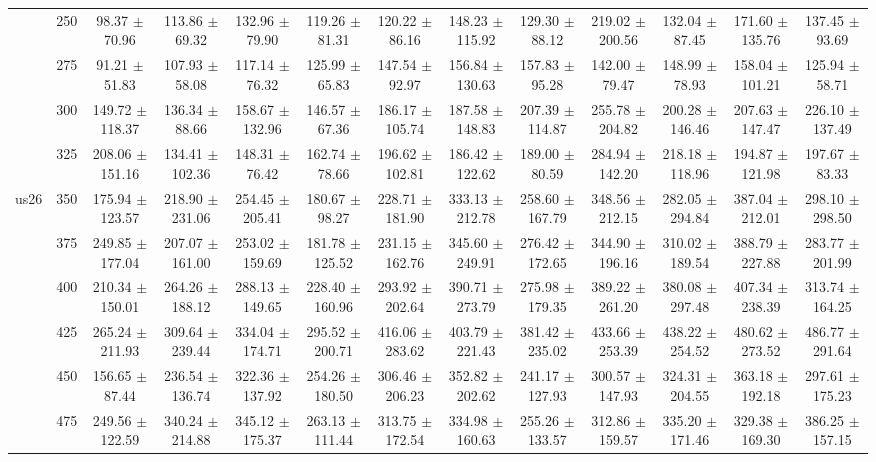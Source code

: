 \begin{table}[h]
{\begin{tabular}{
        ccccccccccccc}
 & 250& 98.37 $\pm$ 70.96& 113.86 $\pm$ 69.32& 132.96 $\pm$ 79.90& 119.26 $\pm$ 81.31& 120.22 $\pm$ 86.16& 148.23 $\pm$ 115.92& 129.30 $\pm$ 88.12& 219.02 $\pm$ 200.56& 132.04 $\pm$ 87.45& 171.60 $\pm$ 135.76& 137.45 $\pm$ 93.69 \\ 
 & 275& 91.21 $\pm$ 51.83& 107.93 $\pm$ 58.08& 117.14 $\pm$ 76.32& 125.99 $\pm$ 65.83& 147.54 $\pm$ 92.97& 156.84 $\pm$ 130.63& 157.83 $\pm$ 95.28& 142.00 $\pm$ 79.47& 148.99 $\pm$ 78.93& 158.04 $\pm$ 101.21& 125.94 $\pm$ 58.71 \\ 
 & 300& 149.72 $\pm$ 118.37& 136.34 $\pm$ 88.66& 158.67 $\pm$ 132.96& 146.57 $\pm$ 67.36& 186.17 $\pm$ 105.74& 187.58 $\pm$ 148.83& 207.39 $\pm$ 114.87& 255.78 $\pm$ 204.82& 200.28 $\pm$ 146.46& 207.63 $\pm$ 147.47& 226.10 $\pm$ 137.49 \\ 
 & 325& 208.06 $\pm$ 151.16& 134.41 $\pm$ 102.36& 148.31 $\pm$ 76.42& 162.74 $\pm$ 78.66& 196.62 $\pm$ 102.81& 186.42 $\pm$ 122.62& 189.00 $\pm$ 80.59& 284.94 $\pm$ 142.20& 218.18 $\pm$ 118.96& 194.87 $\pm$ 121.98& 197.67 $\pm$ 83.33 \\ 
\multirow{4}{*}{us26}& 350& 175.94 $\pm$ 123.57& 218.90 $\pm$ 231.06& 254.45 $\pm$ 205.41& 180.67 $\pm$ 98.27& 228.71 $\pm$ 181.90& 333.13 $\pm$ 212.78& 258.60 $\pm$ 167.79& 348.56 $\pm$ 212.15& 282.05 $\pm$ 294.84& 387.04 $\pm$ 212.01& 298.10 $\pm$ 298.50 \\ 
 & 375& 249.85 $\pm$ 177.04& 207.07 $\pm$ 161.00& 253.02 $\pm$ 159.69& 181.78 $\pm$ 125.52& 231.15 $\pm$ 162.76& 345.60 $\pm$ 249.91& 276.42 $\pm$ 172.65& 344.90 $\pm$ 196.16& 310.02 $\pm$ 189.54& 388.79 $\pm$ 227.88& 283.77 $\pm$ 201.99 \\ 
 & 400& 210.34 $\pm$ 150.01& 264.26 $\pm$ 188.12& 288.13 $\pm$ 149.65& 228.40 $\pm$ 160.96& 293.92 $\pm$ 202.64& 390.71 $\pm$ 273.79& 275.98 $\pm$ 179.35& 389.22 $\pm$ 261.20& 380.08 $\pm$ 297.48& 407.34 $\pm$ 238.39& 313.74 $\pm$ 164.25 \\ 
 & 425& 265.24 $\pm$ 211.93& 309.64 $\pm$ 239.44& 334.04 $\pm$ 174.71& 295.52 $\pm$ 200.71& 416.06 $\pm$ 283.62& 403.79 $\pm$ 221.43& 381.42 $\pm$ 235.02& 433.66 $\pm$ 253.39& 438.22 $\pm$ 254.52& 480.62 $\pm$ 273.52& 486.77 $\pm$ 291.64 \\ 
 & 450& 156.65 $\pm$ 87.44& 236.54 $\pm$ 136.74& 322.36 $\pm$ 137.92& 254.26 $\pm$ 180.50& 306.46 $\pm$ 206.23& 352.82 $\pm$ 202.62& 241.17 $\pm$ 127.93& 300.57 $\pm$ 147.93& 324.31 $\pm$ 204.55& 363.18 $\pm$ 192.18& 297.61 $\pm$ 175.23 \\ 
 & 475& 249.56 $\pm$ 122.59& 340.24 $\pm$ 214.88& 345.12 $\pm$ 175.37& 263.13 $\pm$ 111.44& 313.75 $\pm$ 172.54& 334.98 $\pm$ 160.63& 255.26 $\pm$ 133.57& 312.86 $\pm$ 159.57& 335.20 $\pm$ 171.46& 329.38 $\pm$ 169.30& 386.25 $\pm$ 157.15 \\ 

\end{tabular}}
\end{table}
